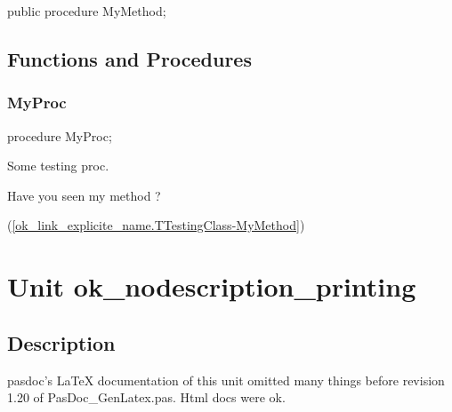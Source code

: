 \documentclass{report}
\begin{document}
\begin{list}{}{
\setlength{\itemindent}{0cm}
\setlength{\listparindent}{0cm}
\setlength{\leftmargin}{\evensidemargin}
\addtolength{\leftmargin}{\tmplength}
\settowidth{\labelsep}{X}
\addtolength{\leftmargin}{\labelsep}
\setlength{\labelwidth}{\tmplength}
}
\begin{flushleft}
\item[\textbf{Declaration}\hfill]
\begin{ttfamily}
public procedure MyMethod;\end{ttfamily}


\end{flushleft}
\end{list}
\section{Functions and Procedures}
\subsection*{MyProc}
\begin{list}{}{
\setlength{\itemindent}{0cm}
\setlength{\listparindent}{0cm}
\setlength{\leftmargin}{\evensidemargin}
\addtolength{\leftmargin}{\tmplength}
\settowidth{\labelsep}{X}
\addtolength{\leftmargin}{\labelsep}
\setlength{\labelwidth}{\tmplength}
}
\begin{flushleft}
\item[\textbf{Declaration}\hfill]
\begin{ttfamily}
procedure MyProc;\end{ttfamily}


\end{flushleft}
\par
\item[\textbf{Description}]
Some testing proc. \begin{ttfamily}Have you seen my method ?\end{ttfamily}(\ref{ok_link_explicite_name.TTestingClass-MyMethod})

\end{list}
\chapter{Unit ok{\_}nodescription{\_}printing}
\section{Description}
pasdoc's LaTeX documentation of this unit omitted many things before revision 1.20 of PasDoc{\_}GenLatex.pas. Html docs were ok.
\end{document}
